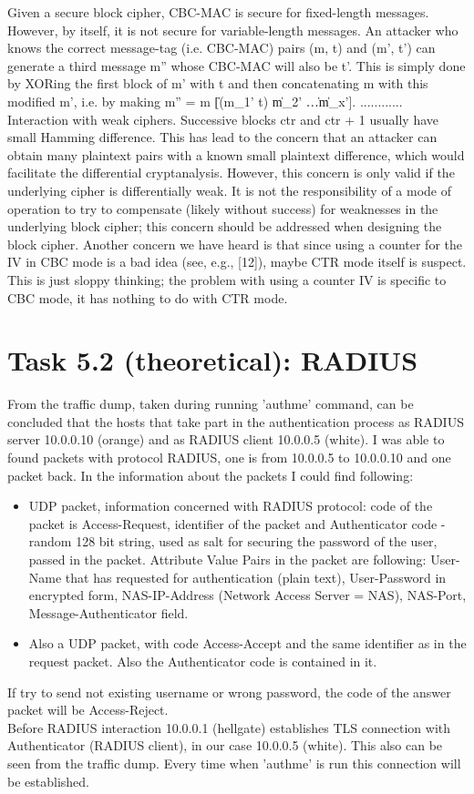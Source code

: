 \documentclass{article}
\begin{document}
Given a secure block cipher, CBC-MAC is secure for fixed-length messages. However, by itself, it is not secure for variable-length messages. An attacker who knows the correct message-tag (i.e. CBC-MAC) pairs (m, t) and (m', t') can generate a third message m'' whose CBC-MAC will also be t'. This is simply done by XORing the first block of m' with t and then concatenating m with this modified m', i.e. by making m'' = m \| [(m_1' \oplus t) \| m_2' \| \dots \| m_x'].
............
Interaction  with  weak  ciphers. 
Successive  blocks 
ctr 
and 
ctr 
+
1  usually  have  small  Hamming  difference.  This 
has  lead  to  the  concern  that  an  attacker  can  obtain  many  plaintext  pairs  with  a  known  small  plaintext  difference, 
which would facilitate the differential cryptanalysis.  However, this concern is  only valid if the underlying cipher is 
differentially weak.  It is not the responsibility of a mode of operation to try to compensate (likely without success) 
for  weaknesses  in  the  underlying block  cipher;  this  concern should  be  addressed when  designing the  block cipher. 
Another concern we have heard is that since using a counter for the IV in CBC mode is a bad idea (see, e.g.,  [12]), 
maybe CTR  mode itself is  suspect.  This is  just sloppy thinking;  the problem with using a  counter IV is  specific to 
CBC mode, it has nothing to do with CTR mode.

\section*{Task 5.2 (theoretical): RADIUS}
From the traffic dump, taken during running 'authme' command, can be concluded that the hosts that take part in the authentication process as RADIUS server 10.0.0.10 (orange) and as RADIUS client 10.0.0.5 (white). I was able to found packets with protocol RADIUS, one is from 10.0.0.5 to 10.0.0.10 and one packet back. In the information about the packets I could find following:
\begin{itemize}
\item UDP packet, information concerned with RADIUS protocol: code of the packet is Access-Request, identifier of the packet and Authenticator code - random 128 bit string, used as salt for securing the password of the user, passed in the packet. Attribute Value Pairs in the packet are following: User-Name that has requested for authentication (plain text), User-Password in encrypted form, NAS-IP-Address (Network Access Server = NAS), NAS-Port, Message-Authenticator field.
\item Also a UDP packet, with code Access-Accept and the same identifier as in the request packet. Also the Authenticator code is contained in it.
\end{itemize}
If try to send not existing username or wrong password, the code of the answer packet will be Access-Reject.
\\
Before RADIUS interaction 10.0.0.1 (hellgate) establishes TLS connection with Authenticator (RADIUS client), in our case 10.0.0.5 (white). This also can be seen from the traffic dump. Every time when 'authme' is run this connection will be established.
\end{document}
